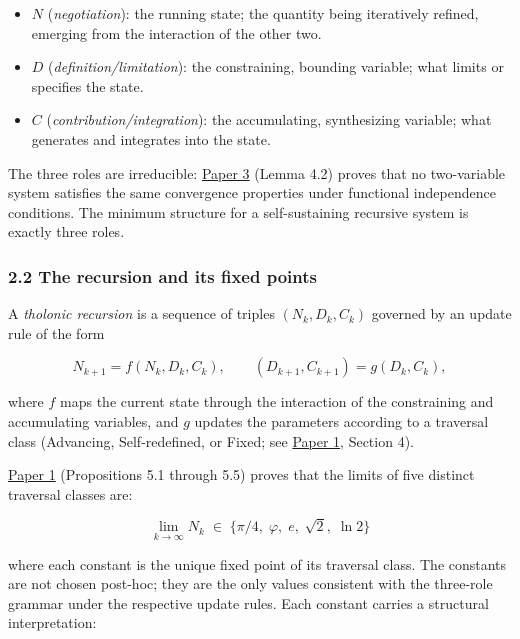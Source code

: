 \documentclass[
  11pt,
  letterpaper,
]{article}
\providecommand{\tightlist}{%
  \setlength{\itemsep}{0pt}\setlength{\parskip}{0pt}}
\begin{document}
\begin{itemize}
\tightlist
\item
  \(N\) (\emph{negotiation}): the running state; the quantity being
  iteratively refined, emerging from the interaction of the other two.
\item
  \(D\) (\emph{definition/limitation}): the constraining, bounding
  variable; what limits or specifies the state.
\item
  \(C\) (\emph{contribution/integration}): the accumulating,
  synthesizing variable; what generates and integrates into the state.
\end{itemize}

The three roles are irreducible:
\href{https://github.com/baardev/truevalue/blob/main/docnav/Research/papers/3_minimal-recursive-triadic-framework/3_minimal-recursive-triadic-framework.pdf}{Paper
3} (Lemma 4.2) proves that no two-variable system satisfies the same
convergence properties under functional independence conditions. The
minimum structure for a self-sustaining recursive system is exactly
three roles.

\subsubsection{2.2 The recursion and its fixed
points}\label{the-recursion-and-its-fixed-points}

A \emph{tholonic recursion} is a sequence of triples \((N_k, D_k, C_k)\)
governed by an update rule of the form

\[N_{k+1} = f(N_k, D_k, C_k), \qquad (D_{k+1}, C_{k+1}) = g(D_k, C_k),\]

where \(f\) maps the current state through the interaction of the
constraining and accumulating variables, and \(g\) updates the
parameters according to a traversal class (Advancing, Self-redefined, or
Fixed; see
\href{https://github.com/baardev/truevalue/blob/main/docnav/Research/papers/1_recursive-tholonic-five-constants/1_recursive-tholonic-five-constants.pdf}{Paper
1}, Section 4).

\href{https://github.com/baardev/truevalue/blob/main/docnav/Research/papers/1_recursive-tholonic-five-constants/1_recursive-tholonic-five-constants.pdf}{Paper
1} (Propositions 5.1 through 5.5) proves that the limits of five
distinct traversal classes are:

\[\lim_{k\to\infty} N_k \;\in\; \{\pi/4,\; \varphi,\; e,\; \sqrt{2},\; \ln 2\}\]

where each constant is the unique fixed point of its traversal class.
The constants are not chosen post-hoc; they are the only values
consistent with the three-role grammar under the respective update
rules. Each constant carries a structural interpretation:
\end{document}
